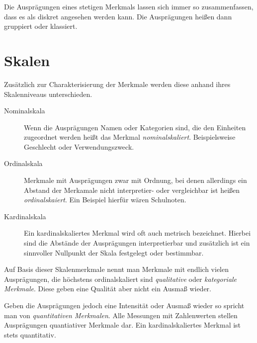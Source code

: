 Die Ausprägungen eines stetigen Merkmals lassen sich immer so zusammenfassen, dass es als diskret angesehen werden kann. Die Ausprägungen heißen dann gruppiert oder klassiert.



\section{Skalen}
Zusätzlich zur Charakterisierung der Merkmale werden diese anhand ihres Skalenniveaus unterschieden.
\begin{description}
	\item[Nominalskala]
		Wenn die Ausprägungen Namen oder Kategorien sind, die den Einheiten zugeordnet werden heißt das Merkmal \emph{nominalskaliert}. Beispielsweise Geschlecht oder Verwendungszweck.
	\item[Ordinalskala]
		Merkmale mit Ausprägungen zwar mit Ordnung, bei denen allerdings ein Abstand der Merkamale nicht interpretier- oder vergleichbar ist heißen \emph{ordinalskaiert}. Ein Beispiel hierfür wären Schulnoten.
	\item[Kardinalskala]
		Ein kardinalskaliertes Merkmal wird oft auch metrisch bezeichnet. Hierbei sind die Abstände der Ausprägungen interpretierbar und zusätzlich ist ein sinnvoller Nullpunkt der Skala festgelegt oder bestimmbar.
\end{description}

Auf Basis dieser Skalenmerkmale nennt man Merkmale mit endlich vielen Ausprägungen, die höchstens ordinalskaliert sind \emph{qualitative} oder \emph{kategoriale Merkmale}. Diese geben eine Qualität aber nicht ein Ausmaß wieder. 

Geben die Ausprägungen jedoch eine Intensität oder Ausmaß wieder so spricht man von \emph{quantitativen Merkmalen}. Alle Messungen mit Zahlenwerten stellen Ausprägungen quantiativer Merkmale dar. Ein kardinalskaliertes Merkmal ist stets quantitativ.



